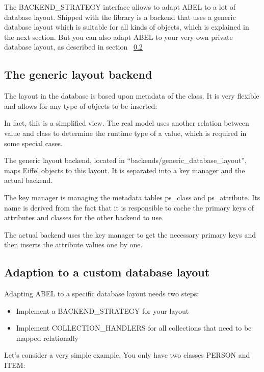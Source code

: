The BACKEND\_STRATEGY interface allows to adapt ABEL to a lot of database layout.
Shipped with the library is a backend that uses a generic database layout which is suitable for all kinds of objects, which is explained in the next section.
But you can also adapt ABEL to your very own private database layout, as described in section ~\ref{subsection:specific_adaption}

\subsection{The generic layout backend}

The layout in the database is based upon metadata of the class. It is very flexible and allows for any type of objects to be inserted:


In fact, this is a simplified view. 
The real model uses another relation between value and class to determine the runtime type of a value, which is required in some special cases.

The generic layout backend, located in ``backends/generic\_database\_layout'', maps Eiffel objects to this layout.
It is separated into a key manager and the actual backend.

The key manager is managing the metadata tables ps\_class and ps\_attribute. 
Its name is derived from the fact that it is responsible to cache the primary keys of attributes and classes for the other backend to use.

The actual backend uses the key manager to get the necessary primary keys and then inserts the attribute values one by one.


\subsection{Adaption to a custom database layout}
\label{subsection:specific_adaption}

Adapting ABEL to a specific database layout needs two steps:
 \begin{itemize}
  \item Implement a BACKEND\_STRATEGY for your layout
  \item Implement COLLECTION\_HANDLERS for all collections that need to be mapped relationally
 \end{itemize}

Let's consider a very simple example. You only have two classes PERSON and ITEM:

